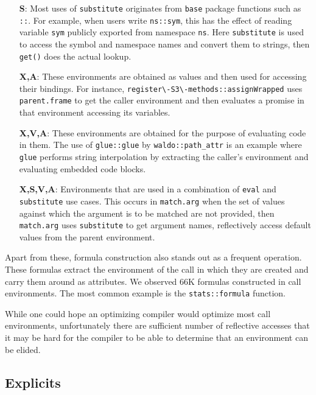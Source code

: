 \documentclass[10pt,review,sigplan,authorversion=true]{acmart}
\renewcommand{\c}[1]{\lstinline |#1|\xspace}
\newcommand{\base}{\c{base}}
\newcommand{\eval}{\c{eval}}
\newcommand{\substitute}{\c{substitute}}
\begin{document}
\begin{itemize}
\item[{\bf S}:] Most uses of \c{substitute} originates from \base package
  functions such as \c{::}. For example, when users write \c{ns::sym}, this has
  the effect of reading variable \c{sym} publicly exported from namespace
  \c{ns}. Here \substitute is used to access the symbol and namespace names and
  convert them to strings, then \c{get()} does the actual lookup.

\item[{\bf X,A}:] These environments are obtained as values and then used for
  accessing their bindings. For instance, \c{register\-S3\-methods::assignWrapped}
  uses \c{parent.frame} to get the caller environment and then evaluates a
  promise in that environment accessing its variables.

\item[{\bf X,V,A}:] These environments are obtained for the purpose of
  evaluating code in them. The use of \c{glue::glue} by \c{waldo::path_attr} is
  an example where \c{glue} performs string interpolation by extracting the
  caller's environment and evaluating embedded code blocks.

\item[{\bf X,S,V,A}:] Environments that are used in a combination of \eval and
  \substitute use cases. This occurs in \c{match.arg} when the set of values
  against which the argument is to be matched are not provided, then
  \c{match.arg} uses \c{substitute} to get argument names, reflectively access
  default values from the parent environment.
\end{itemize}

\noindent
Apart from these, formula construction also stands out as a frequent operation.
These formulas extract the environment of the call in which they are created and
carry them around as attributes. We observed 66K formulas constructed in call
environments. The most common example is the \c{stats::formula} function.

While one could hope an optimizing compiler would optimize most call
environments, unfortunately there are sufficient number of reflective accesses
that it may be hard for the compiler to be able to determine that an environment
can be elided.

\subsection{Explicits}
\end{document}
